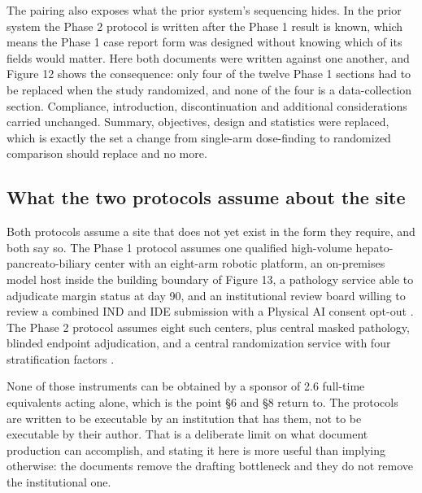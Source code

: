 The pairing also exposes what the prior system's sequencing hides. In the prior
system the Phase 2 protocol is written after the Phase 1 result is known, which
means the Phase 1 case report form was designed without knowing which of its
fields would matter. Here both documents were written against one another, and
Figure 12 shows the consequence: only four of the twelve Phase 1 sections had to
be replaced when the study randomized, and none of the four is a data-collection
section. Compliance, introduction, discontinuation and additional considerations
carried unchanged. Summary, objectives, design and statistics were replaced,
which is exactly the set a change from single-arm dose-finding to randomized
comparison should replace and no more.

\subsection{What the two protocols assume about the site}

Both protocols assume a site that does not yet exist in the form they require,
and both say so. The Phase 1 protocol assumes one qualified high-volume
hepato-pancreato-biliary center with an eight-arm robotic platform, an
on-premises model host inside the building boundary of Figure 13, a pathology
service able to adjudicate margin status at day 90, and an institutional review
board willing to review a combined IND and IDE submission with a Physical AI
consent opt-out \cite{onpremwhippl}. The Phase 2 protocol assumes eight such
centers, plus central masked pathology, blinded endpoint adjudication, and a
central randomization service with four stratification factors
\cite{phase2proto}.

None of those instruments can be obtained by a sponsor of 2.6 full-time
equivalents acting alone, which is the point \S6 and \S8 return to. The
protocols are written to be executable by an institution that has them, not to
be executable by their author. That is a deliberate limit on what document
production can accomplish, and stating it here is more useful than implying
otherwise: the documents remove the drafting bottleneck and they do not remove
the institutional one.
